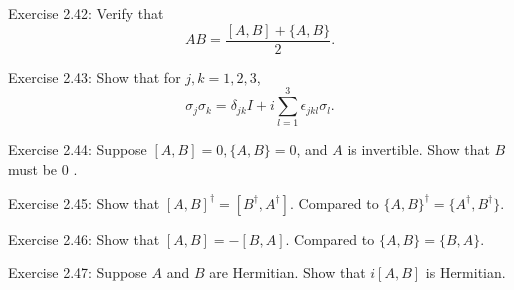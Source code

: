 \begin{exercise}
Exercise 2.42: Verify that
$$
A B=\frac{[A, B]+\{A, B\}}{2}.
$$
\end{exercise}

\begin{exercise}
Exercise 2.43: Show that for $j, k=1,2,3$,
$$
\sigma_{j} \sigma_{k}=\delta_{j k} I+i \sum_{l=1}^{3} \epsilon_{j k l} \sigma_{l}.
$$
\end{exercise}

\begin{exercise}
Exercise 2.44: Suppose $[A, B]=0,\{A, B\}=0$, and $A$ is invertible. Show that $B$ must be 0 .
\end{exercise}

\begin{exercise}
Exercise 2.45: Show that $[A, B]^{\dagger}=\left[B^{\dagger}, A^{\dagger}\right]$. Compared to $\{A, B\}^{\dagger}=\{A^{\dagger}, B^{\dagger}\}$.
\end{exercise}

\begin{exercise}
Exercise 2.46: Show that $[A, B]=-[B, A]$. Compared to $\{A, B\}=\{B, A\}$.
\end{exercise}

\begin{exercise}
Exercise 2.47: Suppose $A$ and $B$ are Hermitian. Show that $i[A, B]$ is Hermitian.
\end{exercise}